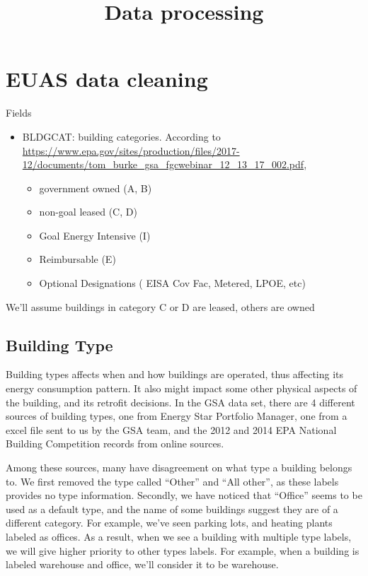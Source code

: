\documentclass[12pt]{article}
\begin{document}
\title{Data processing}
\maketitle
\tableofcontents
\newpage
\section{EUAS data cleaning}

Fields
\begin{itemize}
\item BLDGCAT: building categories. According to
  \url{https://www.epa.gov/sites/production/files/2017-12/documents/tom_burke_gsa_fgcwebinar_12_13_17_002.pdf},
  \begin{itemize}
  \item government owned (A, B)
  \item non-goal leased (C, D)
  \item Goal Energy Intensive (I)
  \item Reimbursable (E)
  \item Optional Designations ( EISA Cov Fac, Metered, LPOE, etc)
  \end{itemize}
\end{itemize}

We'll assume buildings in category C or D are leased, others are owned

\subsection{Building Type}
Building types affects when and how buildings are operated, thus affecting its
energy consumption pattern. It also might impact some other physical aspects of
the building, and its retrofit decisions. In the GSA data set, there are 4
different sources of building types, one from Energy Star Portfolio Manager, one
from a excel file sent to us by the GSA team, and the 2012 and 2014 EPA National
Building Competition records from online sources.

Among these sources, many have disagreement on what type a building belongs to.
We first removed the type called ``Other'' and ``All other'', as these labels
provides no type information. Secondly, we have noticed that ``Office'' seems to
be used as a default type, and the name of some buildings suggest they are of a
different category. For example, we've seen parking lots, and heating plants
labeled as offices. As a result, when we see a building with multiple type
labels, we will give higher priority to other types labels. For example, when a
building is labeled warehouse and office, we'll consider it to be warehouse.
\end{document}
